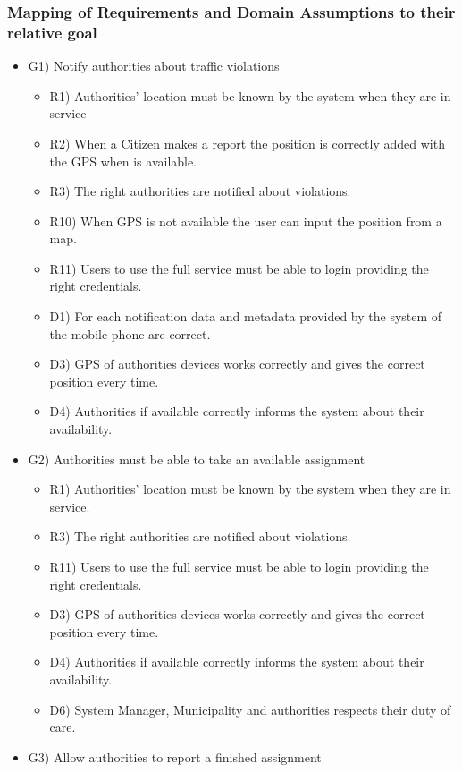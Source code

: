 \subsubsection{Mapping of Requirements and Domain Assumptions to their relative goal}
\begin{itemize}
\item G1) Notify authorities about traffic violations
\begin{itemize}
 \item R1) Authorities’ location must be known by the system when they are in service
 \item R2) When a Citizen makes a report the position is correctly added with the GPS when is available.
 \item R3) The right authorities are notified about violations.
 \item R10) When GPS is not available the user can input the position from a map.
 \item R11) Users to use the full service must be able to login providing the right credentials.
 \item D1) For each notification data and metadata provided by the system of the mobile phone are
correct.
 \item D3) GPS of authorities devices works correctly and gives the correct position every time.
 \item D4) Authorities if available correctly informs the system about their availability.
\end{itemize}
\item G2) Authorities must be able to take an available assignment
\begin{itemize}
 \item R1) Authorities’ location must be known by the system when they are in service.
 \item R3) The right authorities are notified about violations.
 \item R11) Users to use the full service must be able to login providing the right credentials.
 \item D3) GPS of authorities devices works correctly and gives the correct position every time.
 \item D4) Authorities if available correctly informs the system about their availability.
 \item D6) System Manager, Municipality and authorities respects their duty of care.
\end{itemize}
\item G3) Allow authorities to report a finished assignment

\end{itemize}
